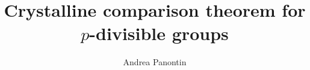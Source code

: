 \documentclass[a4paper,10pt,titlepage]{report}%
\title{Crystalline comparison theorem for $p$-divisible groups}
\author{Andrea Panontin}
\theoremstyle{example}
\theoremstyle{definition}
\numberwithin{equation}{section}
\begin{document}
%
\maketitle

\tableofcontents

\newpage

%





\nocite{*}
\printbibliography
\end{document}
